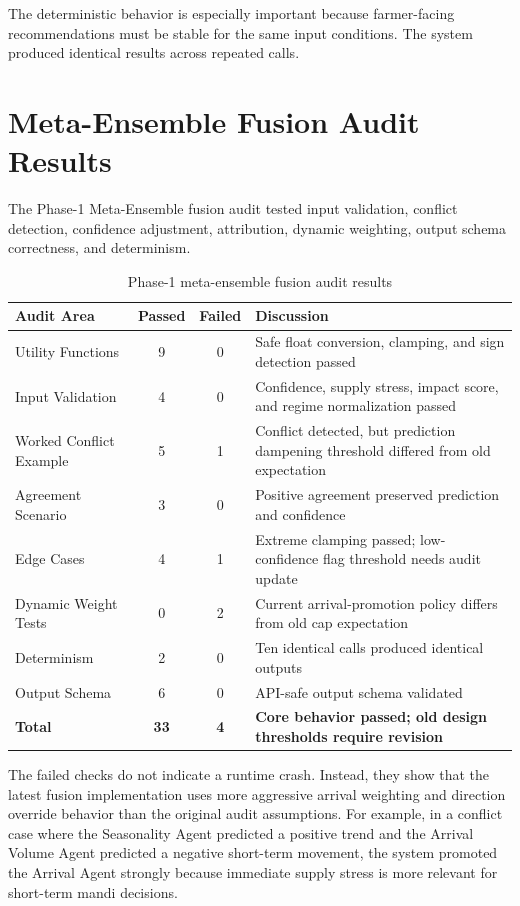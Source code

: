 \documentclass[12pt,a4paper]{report}
\begin{document}
The deterministic behavior is especially important because farmer-facing recommendations must be stable for the same input conditions. The system produced identical results across repeated calls.

\section{Meta-Ensemble Fusion Audit Results}

The Phase-1 Meta-Ensemble fusion audit tested input validation, conflict detection, confidence adjustment, attribution, dynamic weighting, output schema correctness, and determinism.

\begin{table}[H]
\centering
\caption{Phase-1 meta-ensemble fusion audit results}
\label{tab:phase1_meta_audit}
\begin{tabular}{|p{5cm}|c|c|p{5cm}|}
\hline
\textbf{Audit Area} & \textbf{Passed} & \textbf{Failed} & \textbf{Discussion} \\
\hline
Utility Functions & 9 & 0 & Safe float conversion, clamping, and sign detection passed \\
\hline
Input Validation & 4 & 0 & Confidence, supply stress, impact score, and regime normalization passed \\
\hline
Worked Conflict Example & 5 & 1 & Conflict detected, but prediction dampening threshold differed from old expectation \\
\hline
Agreement Scenario & 3 & 0 & Positive agreement preserved prediction and confidence \\
\hline
Edge Cases & 4 & 1 & Extreme clamping passed; low-confidence flag threshold needs audit update \\
\hline
Dynamic Weight Tests & 0 & 2 & Current arrival-promotion policy differs from old cap expectation \\
\hline
Determinism & 2 & 0 & Ten identical calls produced identical outputs \\
\hline
Output Schema & 6 & 0 & API-safe output schema validated \\
\hline
\textbf{Total} & \textbf{33} & \textbf{4} & \textbf{Core behavior passed; old design thresholds require revision} \\
\hline
\end{tabular}
\end{table}

The failed checks do not indicate a runtime crash. Instead, they show that the latest fusion implementation uses more aggressive arrival weighting and direction override behavior than the original audit assumptions. For example, in a conflict case where the Seasonality Agent predicted a positive trend and the Arrival Volume Agent predicted a negative short-term movement, the system promoted the Arrival Agent strongly because immediate supply stress is more relevant for short-term mandi decisions.
\end{document}
